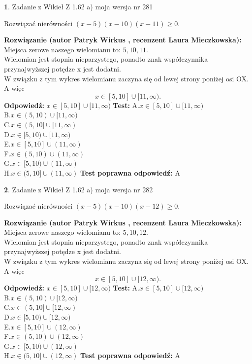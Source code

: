 \documentclass[12pt, a4paper]{article}
\theoremstyle{definition} %
\newtheorem{zad}{}
\newcommand{\zadStart}[1]{\begin{zad}#1\newline}
\newcommand{\zadStop}{\end{zad}}
\newcommand{\rozwStart}[2]{\noindent \textbf{Rozwiązanie (autor #1 , recenzent #2): }\newline}
\newcommand{\rozwStop}{\newline}
\newcommand{\odpStart}{\noindent \textbf{Odpowiedź:}\newline}
\newcommand{\odpStop}{\newline}
\newcommand{\testStart}{\noindent \textbf{Test:}\newline}
\newcommand{\testStop}{\newline}
\newcommand{\kluczStart}{\noindent \textbf{Test poprawna odpowiedź:}\newline}
\newcommand{\kluczStop}{\newline}
\begin{document}
\zadStart{Zadanie z Wikieł Z 1.62 a) moja wersja nr 281}

Rozwiązać nierówności $(x-5)(x-10)(x-11)\ge0$.
\zadStop
\rozwStart{Patryk Wirkus}{Laura Mieczkowska}
Miejsca zerowe naszego wielomianu to: $5, 10, 11$.\\
Wielomian jest stopnia nieparzystego, ponadto znak współczynnika przy\linebreak najwyższej potędze x jest dodatni.\\ W związku z tym wykres wielomianu zaczyna się od lewej strony poniżej osi OX. A więc $$x \in [5,10] \cup [11,\infty).$$
\rozwStop
\odpStart
$x \in [5,10] \cup [11,\infty)$
\odpStop
\testStart
A.$x \in [5,10] \cup [11,\infty)$\\
B.$x \in (5,10) \cup [11,\infty)$\\
C.$x \in (5,10] \cup [11,\infty)$\\
D.$x \in [5,10) \cup [11,\infty)$\\
E.$x \in [5,10] \cup (11,\infty)$\\
F.$x \in (5,10) \cup (11,\infty)$\\
G.$x \in [5,10) \cup (11,\infty)$\\
H.$x \in (5,10] \cup (11,\infty)$
\testStop
\kluczStart
A
\kluczStop



\zadStart{Zadanie z Wikieł Z 1.62 a) moja wersja nr 282}

Rozwiązać nierówności $(x-5)(x-10)(x-12)\ge0$.
\zadStop
\rozwStart{Patryk Wirkus}{Laura Mieczkowska}
Miejsca zerowe naszego wielomianu to: $5, 10, 12$.\\
Wielomian jest stopnia nieparzystego, ponadto znak współczynnika przy\linebreak najwyższej potędze x jest dodatni.\\ W związku z tym wykres wielomianu zaczyna się od lewej strony poniżej osi OX. A więc $$x \in [5,10] \cup [12,\infty).$$
\rozwStop
\odpStart
$x \in [5,10] \cup [12,\infty)$
\odpStop
\testStart
A.$x \in [5,10] \cup [12,\infty)$\\
B.$x \in (5,10) \cup [12,\infty)$\\
C.$x \in (5,10] \cup [12,\infty)$\\
D.$x \in [5,10) \cup [12,\infty)$\\
E.$x \in [5,10] \cup (12,\infty)$\\
F.$x \in (5,10) \cup (12,\infty)$\\
G.$x \in [5,10) \cup (12,\infty)$\\
H.$x \in (5,10] \cup (12,\infty)$
\testStop
\kluczStart
A
\kluczStop
\end{document}
